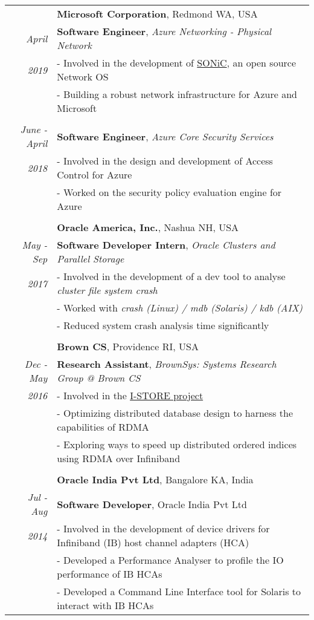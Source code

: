 \documentclass[14pt]{article}
\begin{document}
\begin{tabularx}{\textwidth}{r X}
					& \large\textbf{Microsoft Corporation}, Redmond WA, USA \\
\emph{April} & \textbf{Software Engineer}, \emph{Azure Networking - Physical Network} \\
\emph{2019}				& - Involved in the development of \href{https://azure.github.io/SONiC/}{SONiC}, an open source Network OS \\
					& - Building a robust network infrastructure for Azure and Microsoft \\
\\ 
\emph{June - April} & \textbf{Software Engineer}, \emph{Azure Core Security Services} \\
\emph{2018 \enskip \enskip 2019} 	& - Involved in the design and development of Access Control for Azure \\
					& - Worked on the security policy evaluation engine for Azure \\
\\
					& \large\textbf{Oracle America, Inc.}, Nashua NH, USA \\
\emph{May - Sep} & \textbf{Software Developer Intern}, \emph{Oracle Clusters and Parallel Storage} \\
\emph{2017 \enskip 2017}		& - Involved in the development of a dev tool to analyse \emph{cluster
					 file system crash} \\
					& - Worked with \textit{crash (Linux) / mdb (Solaris) / kdb (AIX)} \\
					& - Reduced system crash analysis time significantly \\
\\ 
					& \large\textbf{Brown CS}, Providence RI, USA \\	
\emph{Dec - May} & \textbf{Research Assistant}, \emph{BrownSys: Systems Research Group @ Brown CS} \\
\emph{2016  \enskip 2018}               & - Involved in the \href{http://binnig.name/?page_id=33}{I-STORE project} \\
					& - Optimizing distributed database design to harness the capabilities of RDMA \\
                                        & - Exploring ways to speed up distributed ordered indices using RDMA over Infiniband \\
\\
					& \large\textbf{Oracle India Pvt Ltd}, Bangalore KA, India \\
\emph{Jul - Aug} & \textbf{Software Developer}, Oracle India Pvt Ltd \\
\emph{2014  \enskip 2016}               & - Involved in the development of device drivers for Infiniband (IB) host channel adapters (HCA)\\
			                & - Developed a Performance Analyser to profile the IO performance of IB HCAs\\
			                & - Developed a Command Line Interface tool for Solaris to interact with IB HCAs
\end{tabularx}
\end{document}
